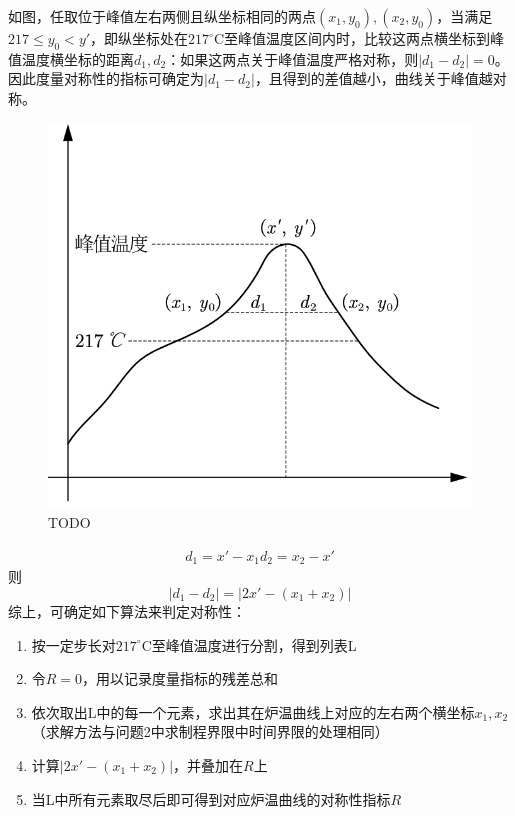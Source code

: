 \documentclass[../main.tex]{subfiles}
\begin{document}

如图，任取位于峰值左右两侧且纵坐标相同的两点\((x_1,y_0 ),(x_2,y_0 )\)，当满足\(217≤y_0<y′\)，即纵坐标处在\(217^{\circ}\mathrm{C}\)至峰值温度区间内时，比较这两点横坐标到峰值温度横坐标的距离\(d_1,d_2\)：如果这两点关于峰值温度严格对称，则\(\vert d_1−d_2 \vert =0\)。因此度量对称性的指标可确定为\(\vert d_1−d_2 \vert\)，且得到的差值越小，曲线关于峰值越对称。

\begin{figure}[H]
		\centering
		\includegraphics[scale = 0.4]{lu_symmetric.jpg}
		\caption{TODO}\label{fig:lu_symmetric}
\end{figure}

\[
\begin{aligned}
d_1=x′−x_1
d_2=x_2−x′
\end{aligned}
\]
则
\begin{equation}
\vert d_1−d_2 \vert =\vert 2x′−(x_1+x_2 )\vert
\end{equation}
综上，可确定如下算法来判定对称性：
\begin{enumerate}
	\item  按一定步长对\(217^{\circ}\mathrm{C}\)至峰值温度进行分割，得到列表L
	\item  令\(R = 0\)，用以记录度量指标的残差总和
	\item  依次取出L中的每一个元素，求出其在炉温曲线上对应的左右两个横坐标\(x_1,x_2\) （求解方法与问题2中求制程界限中时间界限的处理相同）
	\item  计算\(\vert 2x'−(x_1+x_2 )\vert\)，并叠加在\(R\)上
	\item  当L中所有元素取尽后即可得到对应炉温曲线的对称性指标\(R\)
\end{enumerate}
\end{document}
